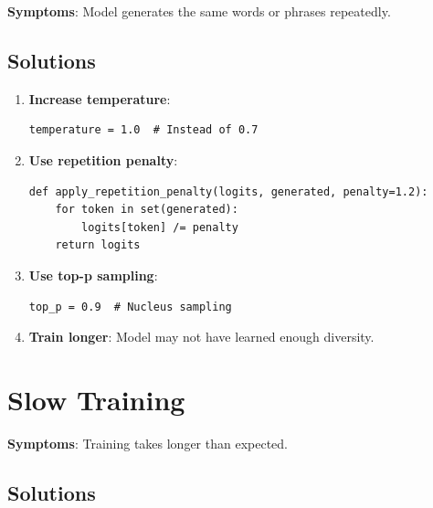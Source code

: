 \textbf{Symptoms}: Model generates the same words or phrases repeatedly.

\subsection{Solutions}

\begin{enumerate}
    \item \textbf{Increase temperature}:
    \begin{lstlisting}[style=python]
temperature = 1.0  # Instead of 0.7
    \end{lstlisting}

    \item \textbf{Use repetition penalty}:
    \begin{lstlisting}[style=python]
def apply_repetition_penalty(logits, generated, penalty=1.2):
    for token in set(generated):
        logits[token] /= penalty
    return logits
    \end{lstlisting}

    \item \textbf{Use top-p sampling}:
    \begin{lstlisting}[style=python]
top_p = 0.9  # Nucleus sampling
    \end{lstlisting}

    \item \textbf{Train longer}: Model may not have learned enough diversity.
\end{enumerate}

\section{Slow Training}

\textbf{Symptoms}: Training takes longer than expected.

\subsection{Solutions}

